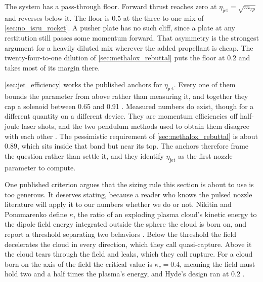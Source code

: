 \documentclass{article}
\begin{document}
The system has a pass-through floor. Forward thrust reaches zero at $\eta_{\mathrm{jet}} = \sqrt{m_{rp}}$ and reverses below it. The floor is $0.5$ at the three-to-one mix of \autoref{sec:no_isru_rocket}. A pusher plate has no such cliff, since a plate at any restitution still passes some momentum forward. That asymmetry is the strongest argument for a heavily diluted mix wherever the added propellant is cheap. The twenty-four-to-one dilution of \autoref{sec:methalox_rebuttal} puts the floor at $0.2$ and takes most of its margin there.

\autoref{sec:jet_efficiency} works the published anchors for $\eta_{\mathrm{jet}}$. Every one of them bounds the parameter from above rather than measuring it, and together they cap a solenoid between \num{0.65} and \num{0.91} \cite{ahedo2010magnetic,hyde1983laserfusion_rocket}. Measured numbers do exist, though for a different quantity on a different device. They are momentum efficiencies off half-joule laser shots, and the two pendulum methods used to obtain them disagree with each other \cite{koba2025measurement}. The pessimistic requirement of \autoref{sec:methalox_rebuttal} is about $0.89$, which sits inside that band but near its top. The anchors therefore frame the question rather than settle it, and they identify $\eta_{\mathrm{jet}}$ as the first nozzle parameter to compute.

One published criterion argues that the sizing rule this section is about to use is too generous. It deserves stating, because a reader who knows the pulsed nozzle literature will apply it to our numbers whether we do or not. Nikitin and Ponomarenko define $\kappa$, the ratio of an exploding plasma cloud's kinetic energy to the dipole field energy integrated outside the sphere the cloud is born on, and report a threshold separating two behaviors \cite{nikitin1993retardation}. Below the threshold the field decelerates the cloud in every direction, which they call quasi-capture. Above it the cloud tears through the field and leaks, which they call rupture. For a cloud born on the axis of the field the critical value is $\kappa_c = 0.4$, meaning the field must hold two and a half times the plasma's energy, and Hyde's design ran at $0.2$ \cite{vchivkov2003thrust,hyde1983laserfusion_rocket}.
\end{document}
